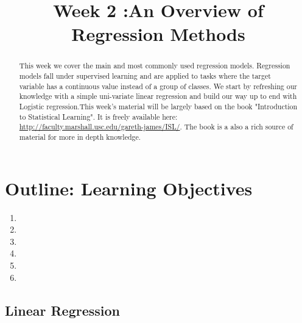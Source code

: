 \documentclass{tufte-handout}
\title{Week 2 :An Overview of Regression Methods }
\author[Ramzi Saouma}
\begin{document}
\maketitle%

\begin{abstract}
\noindent This week we cover the main and most commonly used regression models. Regression models fall under supervised learning and are applied to tasks where the target variable has a continuous value instead of a group of classes. We  start by refreshing our knowledge with a simple uni-variate linear regression and build our way up to end with Logistic regression.This week's material will be largely based on the book "Introduction to Statistical Learning"\cite{Tibshirani2017}. It is freely available here: \url{http://faculty.marshall.usc.edu/gareth-james/ISL/}. The book is a also a rich source of material for more in depth knowledge.
\end{abstract}



\section{Outline: Learning 
Objectives}\label{sec:page-layout}

\begin{enumerate}
    \item {}
    \item {}
    \item {}
    \item {}
    \item {}
    \item {}
\end{enumerate}
\subsection{Linear Regression}\label{sec:Regression}
\end{document}
